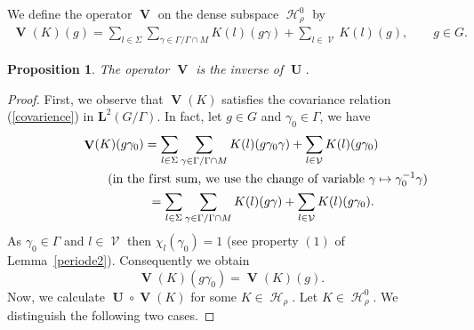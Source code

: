 \documentclass[11pt]{article}
\newtheorem{proposition}{Proposition}
\DeclareMathOperator{\U}{\mathbf{U}}
\DeclareMathOperator{\V}{\mathbf{V}} \DeclareMathOperator{\Aut}{Aut}
\DeclareMathOperator{\nongen}{\mathcal{V}}
\DeclareMathOperator{\Hi}{\mathscr{H}}
\begin{document}
We def\/ine the  operator $\V$  on the dense subspace $ \Hi_\rho^0 $
by
\begin{gather*}
\V(K)(g) =  \sum_{l\in \Sigma} \sum_{\gamma\in \Gamma/\Gamma\cap
M} K(l)(g\gamma)+ \sum _{l\in \nongen} K(l)(g),\qquad g\in G.
\end{gather*}

\setcounter{section}{5}
\setcounter{subsection}{0}
\setcounter{subsubsection}{0}
\setcounter{equation}{15}
\setcounter{proposition}{8}
\begin{proposition}
The operator $\V$ is the inverse of $\U$.
\end{proposition}
\begin{proof}
First, we observe that $\V(K)$ satisf\/ies  the covariance relation
(\ref{covarience}) in $\mathbf{L}^2(G/\Gamma)$. In fact, let $g\in
G$ and $\gamma_0\in \Gamma$, we have
\begin{gather*}
\V(K)(g\gamma_0)   =  \sum_{l\in \Sigma} \sum_{\gamma\in
\Gamma/\Gamma\cap M} K(l)(g\gamma_0\gamma)+ \sum _{l\in
\nongen} K(l)(g\gamma_0)\\
\phantom{\V(K)(g\gamma_0)   =}{}   (\mbox{in the f\/irst sum, we use the  change of variable  }
\gamma\mapsto \gamma_0^{-1}\gamma)\\
\phantom{\V(K)(g\gamma_0)}{}  =  \sum_{l\in \Sigma} \sum_{\gamma\in \Gamma/\Gamma\cap M}
K(l)(g\gamma)+ \sum _{l\in \nongen} K(l)(g\gamma_0).
\end{gather*}
 As $\gamma_0\in \Gamma$ and $l\in \nongen$ then
 $\chi_l(\gamma_0)=1$ (see property $(1)$ of Lemma~\ref{periode2}).
 Consequently we obtain
\[
\V(K)(g\gamma_0)=\V(K)(g).
\]
 Now, we calculate $\U\circ \V (K)$
for some $K\in  \Hi_\rho$.
  Let $K\in \Hi_\rho^0$. We distinguish the following two cases.


\end{proof}
\end{document}
